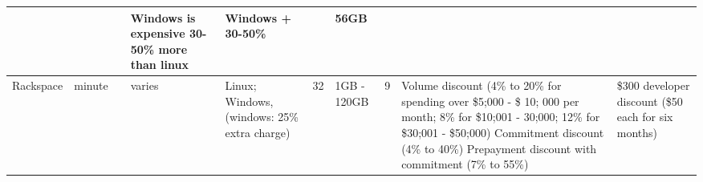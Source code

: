 \documentclass{sig-alternate}
\begin{document}
\begin{table}
\begin{small}
\begin{tabular}{|p{2cm}|p{2cm}|p{1.5cm}|p{1.5cm}|p{2cm}|p{1cm}|p{1.5cm}|p{2cm}|p{2cm}|p{2cm}|}
 &  &  & Windows is expensive 30-50\% more than linux & Windows + 30-50\%  &  & 56GB &  &  & \\
\hline 
Rackspace & minute &  & varies & Linux; Windows, (windows: 25\% extra charge) & 32 & 1GB - 120GB  & 9 & Volume discount (4\% to 20\% for spending over \$5;000 - \$ 10; 000 per month; 8\% for \$10;001 - 30;000; 12\% for \$30;001 - \$50;000) Commitment discount (4\% to 40\%) Prepayment discount with commitment (7\% to 55\%)& \$300 developer discount (\$50 each for six months)\\
\hline
\end{tabular}
\end{small}
\end{table}


% 

 
  
\end{document}
